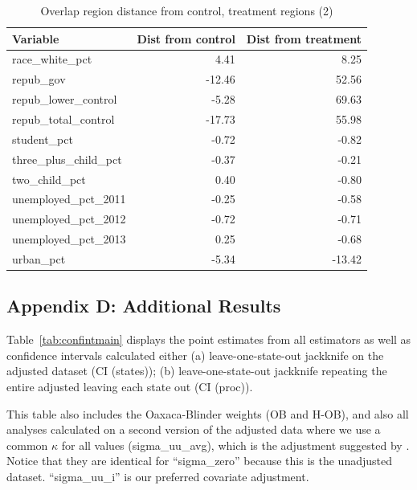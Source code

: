 \documentclass[12pt]{article}
\begin{document}
\begin{table}[ht]
\begin{tabular}{lrr}
  \toprule
Variable & Dist from control & Dist from treatment \\ 
  \midrule
  race\_white\_pct & 4.41 & 8.25 \\ 
  repub\_gov & -12.46 & 52.56 \\ 
  repub\_lower\_control & -5.28 & 69.63 \\ 
  repub\_total\_control & -17.73 & 55.98 \\ 
  student\_pct & -0.72 & -0.82 \\ 
  three\_plus\_child\_pct & -0.37 & -0.21 \\ 
  two\_child\_pct & 0.40 & -0.80 \\ 
  unemployed\_pct\_2011 & -0.25 & -0.58 \\ 
  unemployed\_pct\_2012 & -0.72 & -0.71 \\ 
  unemployed\_pct\_2013 & 0.25 & -0.68 \\ 
  urban\_pct & -5.34 & -13.42 \\ 
   \bottomrule
\end{tabular}
    \caption{Overlap region distance from control, treatment regions (2)}
    \label{tab:oatedist2}
\end{table}

\subsection{Appendix D: Additional Results}

Table~\ref{tab:confintmain} displays the point estimates from all estimators as well as confidence intervals calculated either (a) leave-one-state-out jackknife on the adjusted dataset (CI (states)); (b) leave-one-state-out jackknife repeating the entire adjusted leaving each state out (CI (proc)). 

This table also includes the Oaxaca-Blinder weights (OB and H-OB), and also all analyses calculated on a second version of the adjusted data where we use a common $\kappa$ for all values (sigma\_uu\_avg), which is the adjustment suggested by \cite{carroll2006measurement}. Notice that they are identical for ``sigma\_zero'' because this is the unadjusted dataset. ``sigma\_uu\_i'' is our preferred covariate adjustment.
\end{document}
